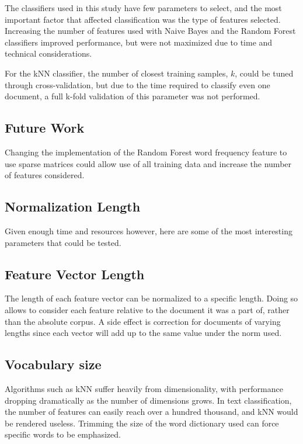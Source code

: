 \documentclass[10pt,twocolumn]{article}
\begin{document}
The classifiers used in this study have few parameters to select, and the most important factor that affected classification was the type of features selected. Increasing the number of features used with Naive Bayes and the Random Forest classifiers improved performance, but were not maximized due to time and technical considerations.

For the kNN classifier, the number of closest training samples, $k$, could be tuned through cross-validation, but due to the time required to classify even one document, a full k-fold validation of this parameter was not performed.

\subsection*{Future Work}

Changing the implementation of the Random Forest word frequency feature to use sparse matrices could allow use of all training data and increase the number of features considered.  

\subsection*{Normalization Length}

Given enough time and resources however, here are some of the most interesting parameters that could be tested.

\subsection*{Feature Vector Length}

The length of each feature vector can be normalized to a specific length. Doing so allows to consider each feature relative to the document it was a part of, rather than the absolute corpus. A side effect is correction for documents of varying lengths since each vector will add up to the same value under the norm used.

\subsection*{Vocabulary size}

Algorithms such as kNN suffer heavily from dimensionality, with performance dropping dramatically as the number of dimensions grows. In text classification, the number of features can easily reach over a hundred thousand, and kNN would be rendered useless. Trimming the size of the word dictionary used can force specific words to be emphasized.
\end{document}

